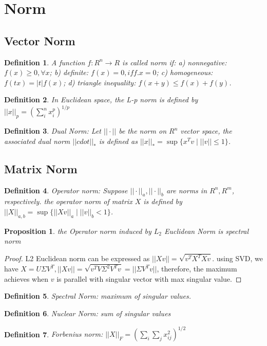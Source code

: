 \documentclass[12pt]{article}
\newtheorem{definition}{Definition}[section]
\newtheorem{proposition}{Proposition}[section]
\begin{document}
\section{Norm}
\subsection{Vector Norm}
\begin{definition}
	A function $f:R^n\to R$ is called norm if: a) nonnegative: $f(x)\ge 0,\forall x$; b) definite: $f(x)=0, iff. x=0$; c) homogeneous: $f(tx)=|t|f(x)$; d) triangle inequality: $f(x+y)\le f(x) + f(y)$.
\end{definition}
\begin{definition}
	In Euclidean space, the L-p norm is defined by $||x||_p = (\sum_i^n x_i^p)^{1/p}$
\end{definition}
\begin{definition}
	Dual Norm: Let $||\cdot||$ be the norm on $R^n$ vector space, the associated dual norm $||cdot||_*$ is defined as $||x||_*=\sup\{x^Tv \mid ||v||\le1 \}$.
\end{definition}

\subsection{Matrix Norm}
\begin{definition}
	Operator norm: Suppose $||\cdot||_a,||\cdot||_b$ are norms in $R^n, R^m$, respectively. the operator norm of matrix $X$ is defined by $||X||_{a,b}=\sup\{||Xv||_a \mid ||v||_b<1\}$.
\end{definition}
\begin{proposition}
	 the Operator norm induced by $L_2$ Euclidean Norm is spectral norm
\end{proposition}
\begin{proof}
	L2 Euclidean norm can be expressed as $||Xv||=\sqrt{v^TX^TXv}$. using SVD, we have $X=U\Sigma V^T, ||Xv||=\sqrt{v^TV\Sigma^2V^Tv}=||\Sigma V^Tv||$, therefore, the maximum achieves when $v$ is parallel with singular vector with max singular value.
\end{proof}
\begin{definition}
	Spectral Norm: maximum of singular values.
\end{definition}
\begin{definition}
	Nuclear Norm: sum of singular values
\end{definition}
\begin{definition}
	Forbenius norm: $||X||_F = (\sum_i\sum_j x_{ij}^2)^{1/2}$
\end{definition}
\end{document}
